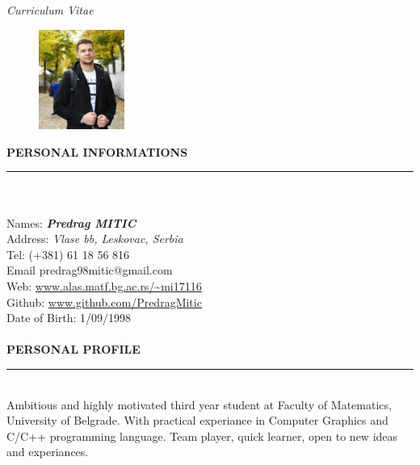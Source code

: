 \documentclass{article}
\begin{document}
\begin{center}
	\textit{\Huge Curriculum Vitae}   
	\vspace*{1cm}
\end{center}

\begin{figure} 
	\includegraphics[width=0.25\textwidth]{my_pic.jpeg}
\end{figure}

\textbf{\large PERSONAL INFORMATIONS}\\
\color{my_col}\noindent\rule{10cm}{0.8pt}\color{black}\\ \\
Names:  \textbf{\emph{Predrag MITIC}} \\
Address: \emph{Vlase bb, Leskovac, Serbia }\\
Tel: 	(+381) 61 18 56 816 \\
Email	predrag98mitic@gmail.com \\ 
Web:	\url{www.alas.matf.bg.ac.rs/~mi17116} \\
Github:	\url{www.github.com/PredragMitic} \\ 
Date of Birth: 1/09/1998 \\ \\

\textbf{\large PERSONAL PROFILE}\\
\color{my_col}\noindent\rule{15.4cm}{0.6pt}\color{black}\\ 
Ambitious and highly motivated third year student at Faculty of Matematics, 
University of Belgrade. With practical experiance in Computer Graphics and 
C/C++ programming language. Team player, quick learner, open to new ideas and experiances.\\
\end{document}
